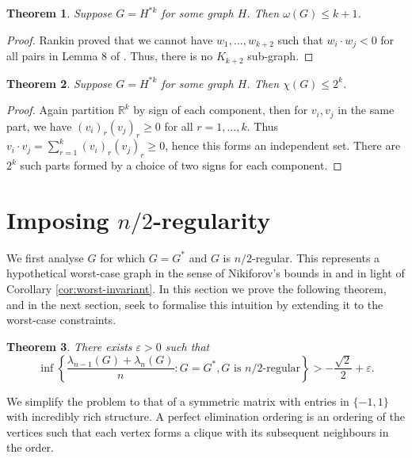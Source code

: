 \documentclass[11pt]{article}
\newtheorem{thm}{Theorem}[section]
\begin{document}
\begin{thm}\label{thm:generalised-operation-clique}
    Suppose $G = H^{*k}$ for some graph $H$. Then $\omega(G) \le k+1$.
\end{thm}
\begin{proof}
    Rankin proved that we cannot have $w_1, \dots, w_{k+2}$ such that $w_i \cdot w_j < 0$ for all pairs in Lemma 8 of \cite{rankin1947packing}. Thus, there is no $K_{k+2}$ sub-graph. 
\end{proof}

\begin{thm}\label{thm:generalised-operation-chromatic}
    Suppose $G = H^{*k}$ for some graph $H$. Then $\chi(G) \le 2^k$.
\end{thm}
\begin{proof}
    Again partition $\mathbb{R}^k$ by sign of each component, then for $v_i, v_j$ in the same part, we have $(v_i)_r(v_j)_r \ge 0$ for all $r = 1, \dots, k$. Thus $v_i \cdot v_j = \sum_{r = 1}^k (v_i)_r(v_j)_r \ge 0$, hence this forms an independent set. There are $2^k$ such parts formed by a choice of two signs for each component. 
\end{proof}

\section{Imposing $n/2$-regularity}\label{section:n/2-regular}

We first analyse $G$ for which $G = G^*$ and $G$ is $n/2$-regular. This represents a hypothetical worst-case graph in the sense of Nikiforov's bounds in \cite{nikiforov2015extrema} and in light of Corollary \ref{cor:worst-invariant}. In this section we prove the following theorem, and in the next section, seek to formalise this intuition by extending it to the worst-case constraints. 

\begin{thm}\label{thm:n/2-regular}
    There exists $\varepsilon > 0$ such that
    \[\inf\left\{\frac{\lambda_{n-1}(G) + \lambda_n(G)}{n} : G = G^*, G \textrm{ is $n/2$-regular}\right\} > -\frac{\sqrt{2}}{2} + \varepsilon.\]
\end{thm}

We simplify the problem to that of a symmetric matrix with entries in $\{-1, 1\}$ with incredibly rich structure. A perfect elimination ordering is an ordering of the vertices such that each vertex forms a clique with its subsequent neighbours in the order.
\end{document}
